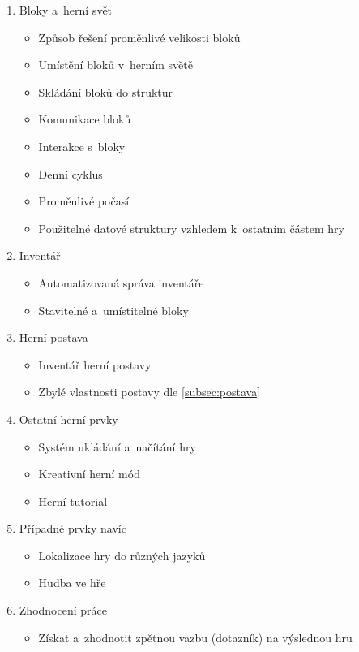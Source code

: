 \begin{enumerate}

 \item Bloky a~herní svět
\begin{itemize}
	\item Způsob řešení proměnlivé velikosti bloků
	\item Umístění bloků v~herním světě
	\item Skládání bloků do struktur
	\item Komunikace bloků
	\item Interakce s~bloky
	\item Denní cyklus
	\item Proměnlivé počasí
	\item Použitelné datové struktury vzhledem k~ostatním částem hry
\end{itemize}

 \item Inventář
\begin{itemize}
	\item Automatizovaná správa inventáře
	\item Stavitelné a~umístitelné bloky
\end{itemize}

 \item Herní postava
\begin{itemize}
	\item Inventář herní postavy
	\item Zbylé vlastnosti postavy dle \ref{subsec:postava}
\end{itemize}

 \item Ostatní herní prvky
\begin{itemize}
	\item Systém ukládání a~načítání hry
	\item Kreativní herní mód
	\item Herní tutorial
\end{itemize}

 \item Případné prvky navíc
\begin{itemize}
	\item Lokalizace hry do různých jazyků
	\item Hudba ve hře
\end{itemize}

 \item Zhodnocení práce
\begin{itemize}
	\item Získat a~zhodnotit zpětnou vazbu (dotazník) na výslednou hru
\end{itemize}


\end{enumerate}
